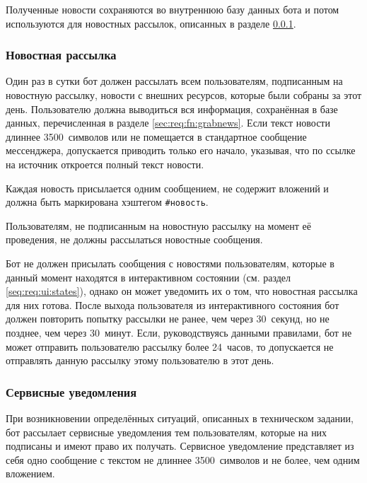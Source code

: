         Полученные новости сохраняются во внутреннюю базу данных бота и потом используются для новостных
        рассылок, описанных в разделе \ref{sec:req:fn:newsletter}.


    \subsubsection{Новостная рассылка}
        \label{sec:req:fn:newsletter}
        Один раз в сутки  бот
        должен рассылать всем пользователям, подписанным на новостную рассылку, новости с внешних
        ресурсов, которые были собраны за этот день. Пользователю
        должна выводиться вся информация, сохранённая в базе данных, перечисленная в разделе
        \ref{sec:req:fn:grabnews}. Если текст новости длиннее 3500~символов или не помещается в
        стандартное сообщение мессенджера, допускается приводить только его начало, указывая,
        что по ссылке на источник откроется полный текст новости.

        Каждая новость присылается одним сообщением, не содержит вложений и
        должна быть маркирована хэштегом \hbox{\texttt{\#новость}}.

        Пользователям, не подписанным на новостную рассылку на момент её проведения, не должны
        рассылаться новостные сообщения.

        Бот не должен присылать сообщения с новостями пользователям, которые в данный момент находятся
        в интерактивном состоянии (см. раздел \ref{seq:req:ui:states}),
        однако он может уведомить их о том, что новостная рассылка для них готова.
        После выхода пользователя из интерактивного состояния бот должен повторить попытку
        рассылки не ранее, чем через 30~секунд, но не позднее, чем через 30~минут.
        Если, руководствуясь данными правилами, бот не может отправить пользователю рассылку
        более 24~часов, то допускается не отправлять данную рассылку этому пользователю в этот день.

    \subsubsection{Сервисные уведомления}
        \label{sec:req:fn:service}
        При возникновении определённых ситуаций, описанных в техническом задании,
        бот рассылает сервисные уведомления тем пользователям, которые на них подписаны и имеют
        право их получать. Сервисное уведомление представляет из себя одно сообщение с текстом
        не длиннее 3500~символов и не более, чем одним вложением.


